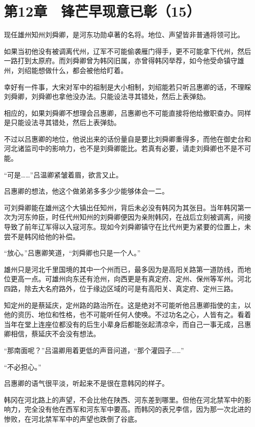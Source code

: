 \section{第12章　锋芒早现意已彰（15）}

现任雄州知州刘舜卿，是河东功勋卓著的名将。地位、声望皆非普通将领可比。

如果当初他没有被调离代州，辽军不可能偷袭雁门得手，更不可能拿下代州，然后一路打到太原府。而刘舜卿曾为韩冈旧属，亦曾得韩冈举荐，如今他受命镇守雄州，刘绍能想做什么，都会被他给盯着。

幸好有一件事，大宋对军中的祖制是大小相制，刘绍能若只听吕惠卿的话，不理睬刘舜卿，刘舜卿也拿他没办法。只能设法寻其错处，然后上表弹劾。

相应的，如果刘舜卿不想理会吕惠卿，吕惠卿也不可能直接将他给撤职查办。同样是只能设法寻其错处，然后上表弹劾。

不过以吕惠卿的地位，他说出来的话份量自是要比刘舜卿重得多，而他在御史台和河北诸监司中的影响力，也不是刘舜卿能比。若真有必要，请走刘舜卿也不是不可能。

“可是……”吕温卿紧皱着眉，欲言又止。

吕惠卿的想法，他这个做弟弟多多少少能够体会一二。

可刘舜卿能在雄州这个大镇出任知州，背后未必没有韩冈为其张目。当年韩冈第一次为河东帅臣，时任代州知州的刘舜卿便因为亲附韩冈，在战后立刻被调离，间接导致了前年辽军得以入寇河东。现如今刘舜卿镇守在比代州更为紧要的位置上，未尝不是韩冈给他的补偿。

“放心。”吕惠卿笑道，“刘舜卿也只是一个人。”

雄州只是河北千里国境的其中一个州而已，最多因为是高阳关路第一道防线，而地位更高一点。可雄州向东还有沧州，向西更是有真定府、定州、保州等军州。河北四路，除去大名府路外，位于缘边区域的可是有高阳关、真定府、定州三路。

知定州的是蔡延庆，定州路的路治所在。这是绝对不可能听他吕惠卿指使的主，以他的资历、地位和性格，也不可能听任何人使唤。不过功名之心，人皆有之。看着当年在堂上连座位都没有的后生小辈身后都能张起清凉伞，而自己一事无成，吕惠卿相信，蔡延庆不会没有想法。

“那南面呢？”吕温卿用着更低的声音问道，“那个灌园子……”

“不必担心。”

吕惠卿的语气很平淡，听起来不是很在意韩冈的样子。

韩冈在河北路上的声望，不会比他在陕西、河东差到哪里。但他在河北禁军中的影响力，完全没有他在西军和河东军中要高。而韩冈的表兄李信，因为那一次北进的惨败，在河北禁军军中的声望也跌倒了谷底。


